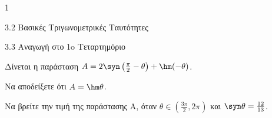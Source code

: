 \begin{ylh}{1}
\item 3.2 Βασικές Τριγωνομετρικές Ταυτότητες
\item 3.3 Αναγωγή στο 1o Τεταρτημόριο
\end{ylh}
Δίνεται η παράσταση $A = 2\syn \left(\frac{\pi}{2} - \theta\right) + \hm (-\theta)$.
\begin{alist}
\item Να αποδείξετε ότι $A = \hm \theta$.
\item Να βρείτε την τιμή της παράστασης Α, όταν $\theta \in \left(\frac{3\pi}{2}, 2\pi\right)$ και $\syn \theta = \frac{12}{13}$.
\end{alist}


